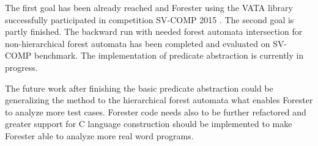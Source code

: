 \documentclass[fleqn,11pt]{ExcelAtFIT} %
\begin{document}
The first goal has been already reached and Forester using the VATA library successfully participated in competition SV-COMP 2015 \cite{www:svcomp}.
The second goal is partly finished.
The backward run with needed forest automata intersection for non-hierarchical forest automata has been completed and evaluated on SV-COMP benchmark.
The implementation of predicate abstraction is currently in progress.

The future work after finishing the basic predicate abstraction could be generalizing the method to the hierarchical forest automata
what enables Forester to analyze more test cases.
Forester code needs also to be further refactored and greater support for C language construction should be implemented to make Forester able
to analyze more real word programs.






\end{document}
